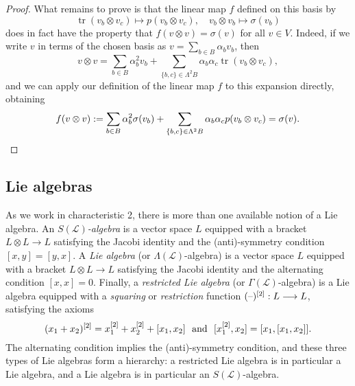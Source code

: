 \documentclass[11pt]{amsart}
\theoremstyle{plain}
\theoremstyle{definition}
\DeclareMathOperator{\trace}{tr}
\newcommand{\DASH}{\textup{--}}
\renewcommand{\to}{\longrightarrow}
\newcommand{\scrL}{\mathscr{L}}
\theoremstyle{plain}
\newcommand{\LieOperad}{{\scrL}}
\newcommand{\restn}[1]{#1^{[2]}}
\begin{document}
\begin{Conventions and notation}
\begin{proof}
What remains to prove is that the linear map $f$ defined on this basis by
\[\trace(v_b\otimes v_c)\mapsto p(v_b\otimes v_c),\quad v_b\otimes v_b\mapsto \sigma(v_b)\]
does in fact have the property that $f(v\otimes v)=\sigma(v)$ for \textup{all} $v\in V$. Indeed, if we write $v$ in terms of the chosen basis as $v=\sum_{b\in B}\alpha_bv_b$, then
\[v\otimes v
=
\sum_{b\in B}\alpha_b^2v_b+\sum_{\{b,c\}\in \Lambda^2B}\alpha_b\alpha_c\trace(v_b\otimes v_c),\]
and we can apply our definition of the linear map $f$ to this expansion directly, obtaining
\[f(v\otimes v):=
\sum_{b\in B}\alpha_b^2\sigma(v_b)+\sum_{\{b,c\}\in \Lambda^2B}\alpha_b\alpha_cp(v_b\otimes v_c)=\sigma(v).\qedhere\]
\end{proof}
\subsection{Lie algebras}
As we work in characteristic 2, there is more than one available notion of a Lie algebra. An \emph{$S(\LieOperad)$-algebra} is a vector space $L$ equipped with a bracket $L\otimes L\to L$ satisfying the Jacobi identity and the (anti)-symmetry condition $[x,y]=[y,x]$. A \emph{Lie algebra} (or $\Lambda(\LieOperad)$-algebra) is a vector space $L$ equipped with a bracket $L\otimes L\to L$ satisfying the Jacobi identity and the alternating condition $[x,x]=0$. Finally, a \emph{restricted Lie algebra} \cite{CurtisSimplicialHtpy.pdf,6Author.pdf} (or $\Gamma(\LieOperad)$-algebra) is a Lie algebra equipped with a \emph{squaring} or \emph{restriction} function $\restn{(\DASH)}:L\to L$, satisfying the axioms
\[\restn{(x_1+x_2)}=\restn{x_1}+\restn{x_2}+[x_1,x_2]\textup{ \ and \ }[\restn{x_1},x_2]=[x_1,[x_1,x_2]].\]
The alternating condition implies the (anti)-symmetry condition, and these three types of Lie algebras form a hierarchy: a restricted Lie algebra is in particular a Lie algebra, and a Lie algebra is in particular an $S(\LieOperad)$-algebra.


\end{Conventions and notation}
\end{document}
